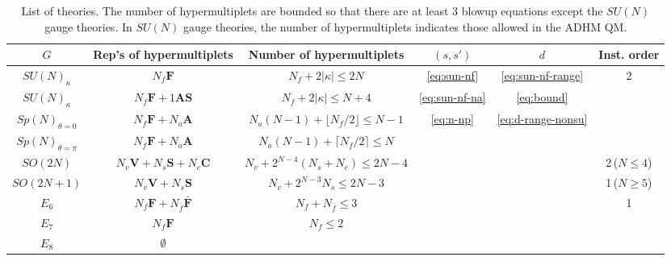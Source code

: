 \documentclass[letterpaper, 11pt]{article}
\begin{document}
{\begin{table}[p]
  \centering
  \begin{tabular}{|c|c|c|c|c|c|}
    \hline
    $G$ & Rep's of hypermultiplets & Number of hypermultiplets &   $(s, s')$ & $d$ & Inst. order\\
    \hline
    $SU(N)_\kappa$ & $N_f \boldsymbol{F}$ & $N_f+2|\kappa|\leq 2N$ &    \eqref{eq:sun-nf} & \eqref{eq:sun-nf-range} & \multirow{4}{*}{2}\\
    \cline{1-5}
    $SU(N)_\kappa$ & $N_f \boldsymbol{F}+1\textbf{AS}$ & $N_f+2|\kappa|\leq N+4$ &    \eqref{eq:sun-nf-na} & \eqref{eq:bound} &\\
    \cline{1-5}
    $Sp(N)_{\theta=0}$ & $N_f\boldsymbol{F}+N_a\boldsymbol{A}$ & $N_a(N-1)+\lfloor N_f/2\rfloor\leq N-1$ &   \multirow{7}{*}{\eqref{eq:n-np}}& \multirow{7}{*}{\eqref{eq:d-range-nonsu}} &\\
    \cline{1-3}
    $Sp(N)_{\theta=\pi}$ & $N_f\boldsymbol{F}+N_a\boldsymbol{A}$ & $N_a(N-1)+\lceil N_f/2\rceil\leq N$ & & &\\
    \cline{1-3}\cline{6-6}
    $SO(2N)$ & $N_v\boldsymbol{V}+N_s\boldsymbol{S}+N_c\boldsymbol{C}$ & $N_v+2^{N-4}(N_s+N_c)\leq 2N-4$ &  & & 2\,($N\leq 4$)\\
    \cline{1-3}
    $SO(2N+1)$ & $N_v\boldsymbol{V}+N_s\boldsymbol{S}$ & $N_v+2^{N-3}N_s\leq2 N-3$ & & & 1\,($N\geq 5$)  \\
    \cline{1-3}\cline{6-6}
    $E_6$ & $N_f\boldsymbol{F}+N_{\bar{f}}\boldsymbol{\bar{F}}$ & $N_f+N_{\bar{f}}\leq3 $ & & & \multirow{3}{*}{1}  \\
    \cline{1-3}
    $E_7$ & $N_f\boldsymbol{F}$ & $N_f\leq2$ & & &   \\
    \cline{1-3}
    $E_8$ & $\emptyset$ &  & & &   \\
    \hline
    \end{tabular}
    \caption{List of theories. The number of hypermultiplets are bounded so that there are at least 3 blowup equations except the $SU(N)$ gauge theories. In $SU(N)$ gauge theories, the number of hypermultiplets indicates those allowed in the ADHM QM.}
    \label{tbl:list}
\vspace{1cm}


\end{table}}
\end{document}
